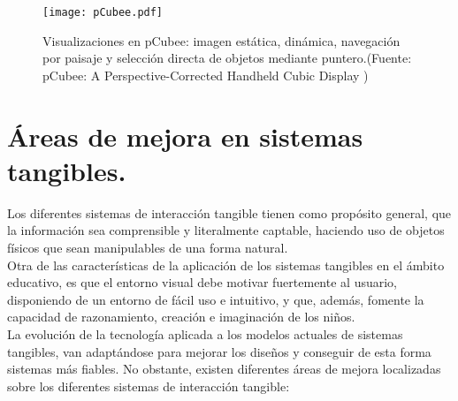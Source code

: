 \begin{figure}[!h]
\begin{center}
\texttt{[image: pCubee.pdf]}
\caption{Visualizaciones en pCubee: imagen estática, dinámica, navegación por paisaje y selección directa de objetos mediante puntero.(Fuente: pCubee: A Perspective-Corrected Handheld Cubic Display \cite{pCubee})}
\label{fig:pCubee}
\end{center}
\end{figure}


\section{Áreas de mejora en sistemas tangibles.}
Los diferentes sistemas de interacción tangible tienen como propósito general, que la
información sea comprensible y literalmente captable, haciendo uso de objetos físicos
que sean manipulables de una forma natural.\\
Otra de las características de la aplicación de los sistemas tangibles en el ámbito
educativo, es que el entorno visual debe motivar fuertemente al usuario, disponiendo
de un entorno de fácil uso e intuitivo, y que, además, fomente la capacidad de
razonamiento, creación e imaginación de los niños.\\
La evolución de la tecnología aplicada a los modelos actuales de sistemas tangibles, van
adaptándose para mejorar los diseños y conseguir de esta forma sistemas más fiables.
No obstante, existen diferentes áreas de mejora localizadas sobre los diferentes
sistemas de interacción tangible:
